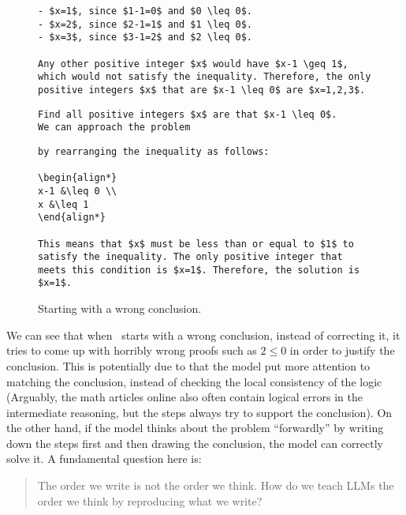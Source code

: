 \begin{figure}[H]
\begin{AIbox}{\DV}
\begin{verbatim}
- $x=1$, since $1-1=0$ and $0 \leq 0$.
- $x=2$, since $2-1=1$ and $1 \leq 0$.
- $x=3$, since $3-1=2$ and $2 \leq 0$.

Any other positive integer $x$ would have $x-1 \geq 1$, which would not satisfy the inequality. Therefore, the only positive integers $x$ that are $x-1 \leq 0$ are $x=1,2,3$.
\end{verbatim}
\tcbline
\begin{verbatim}
Find all positive integers $x$ are that $x-1 \leq 0$. 
We can approach the problem
\end{verbatim}
\vspace{-\belowdisplayskip}\vspace{-\abovedisplayskip}
\begin{verbatim}
by rearranging the inequality as follows:

\begin{align*}
x-1 &\leq 0 \\
x &\leq 1
\end{align*}

This means that $x$ must be less than or equal to $1$ to satisfy the inequality. The only positive integer that meets this condition is $x=1$. Therefore, the solution is $x=1$.
\end{verbatim}
\end{AIbox}
\caption{Starting with a wrong conclusion.}
\label{fig:math-justification}
\end{figure}


We can see that when \DV \ starts with a wrong conclusion, instead of correcting it, it tries to come up with horribly wrong proofs such as $2 \leq 0$ in order to justify the conclusion. This is potentially due to that the model put more attention to matching the conclusion, instead of checking the local consistency of the logic (Arguably, the math articles online also often contain logical errors in the intermediate reasoning, but the steps always try to support the conclusion). 
 On the other hand, if the model thinks about the problem ``forwardly'' by writing down the steps first and then drawing the conclusion, the model can correctly solve it. A fundamental question here is:
\begin{quote}
The order we write is not the order we think. How do we teach LLMs the order we think by reproducing what we write?
\end{quote}

